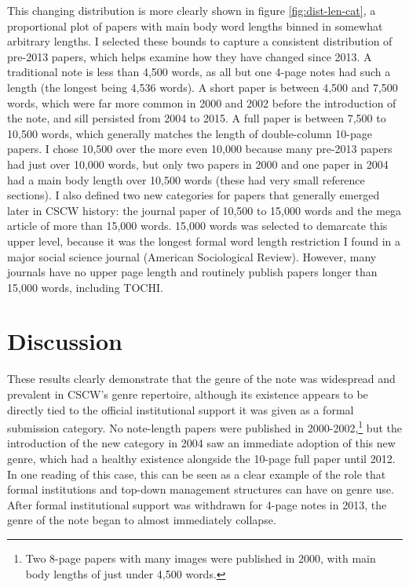 \documentclass[format=acmsmall, screen=true]{acmart}
\begin{document}
This changing distribution is more clearly shown in figure \ref{fig:dist-len-cat}, a proportional plot of papers with main body word lengths binned in somewhat arbitrary lengths. I selected these bounds to capture a consistent distribution of pre-2013 papers, which helps examine how they have changed since 2013. A traditional note is less than 4,500 words, as all but one 4-page notes had such a length (the longest being 4,536 words). A short paper is between 4,500 and 7,500 words, which were far more common in 2000 and 2002 before the introduction of the note, and sill persisted from 2004 to 2015. A full paper is between 7,500 to 10,500 words, which generally matches the length of double-column 10-page papers. I chose 10,500 over the more even 10,000 because many pre-2013 papers had just over 10,000 words, but only two papers in 2000 and one paper in 2004 had a main body length over 10,500 words (these had very small reference sections). I also defined two new categories for papers that generally emerged later in CSCW history: the journal paper of 10,500 to 15,000 words and the mega article of more than 15,000 words. 15,000 words was selected to demarcate this upper level, because it was the longest formal word length restriction I found in a major social science journal (American Sociological Review). However, many journals have no upper page length and routinely publish papers longer than 15,000 words, including TOCHI.

\section{Discussion}
These results clearly demonstrate that the genre of the note was widespread and prevalent in CSCW's genre repertoire, although its existence appears to be directly tied to the official institutional support it was given as a formal submission category. No note-length papers were published in 2000-2002,\footnote{ Two 8-page papers with many images were published in 2000, with main body lengths of just under 4,500 words.} but the introduction of the new category in 2004 saw an immediate adoption of this new genre, which had a healthy existence alongside the 10-page full paper until 2012. In one reading of this case, this can be seen as a clear example of the role that formal institutions and top-down management structures can have on genre use. After formal institutional support was withdrawn for 4-page notes in 2013, the genre of the note began to almost immediately collapse. 
\end{document}
